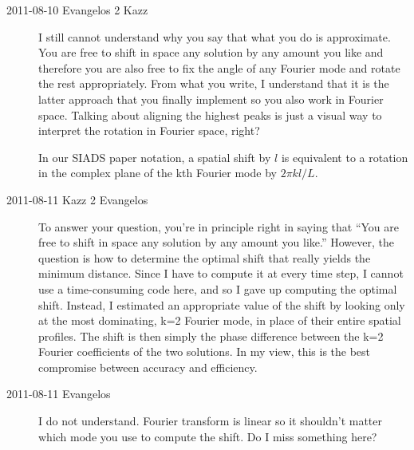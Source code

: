 \begin{description}
\item[2011-08-10 Evangelos 2 Kazz] I still cannot understand why you say that 
what you do is approximate.
You are free to shift in space any solution by any amount you like and
therefore you are also free to fix the angle of any Fourier mode and
rotate the rest appropriately. From what you write, I understand that
it is the latter approach that you finally implement so you also work
in Fourier space. Talking about aligning the highest peaks is just a
visual way to interpret the rotation in Fourier space, right?

In our SIADS paper notation, a spatial shift by $l$ is equivalent to a
rotation in the complex plane of the kth Fourier mode by $2\pi k l /L$. 

\item[2011-08-11 Kazz 2 Evangelos] To answer your question, you're in principle 
right in saying that
``You are free to shift in space any solution by any amount you like.''
However, the question is how to determine the optimal shift that really yields 
the minimum distance. Since I have to compute it at every time step, 
I cannot use a time-consuming code here, and so I gave up computing the 
optimal shift. Instead, I estimated an appropriate value of the shift by 
looking only at the most dominating, k=2 Fourier mode, in place of their 
entire spatial profiles. The shift is then simply the phase difference 
between the k=2 Fourier coefficients of the two solutions. 
In my view, this is the best compromise between accuracy and efficiency.

\item[2011-08-11 Evangelos] I do not understand. Fourier transform is 
linear so it shouldn't matter which mode you use to compute the shift. 
Do I miss something here?

\end{description}
